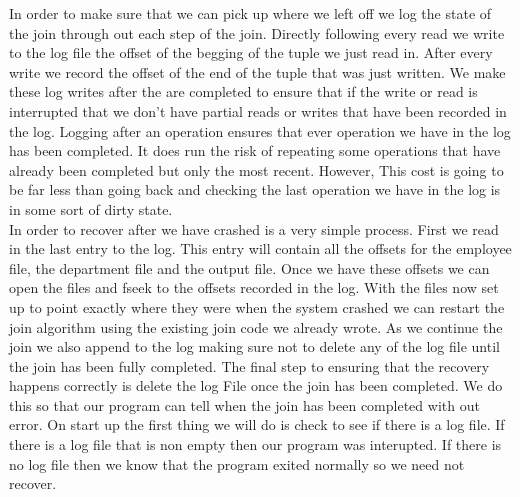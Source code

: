\documentclass[11pt]{article}
\begin{document}
In order to make sure that we can pick up where we left off we log the state of the join through out each step of the join. Directly following every read we write to the log file the offset of the begging of the tuple we just read in. After every write we record the offset of the end of the tuple that was just written. We make these log writes after the are completed to ensure that if the write or read is interrupted that we don't have partial reads or writes that have been recorded in the log. Logging after an operation ensures that ever operation we have in the log has been completed. It does run the risk of repeating some operations that have already been completed but only the most recent. However, This cost is going to be far less than going back and checking the last operation we have in the log is in some sort of dirty state.\\

In order to recover after we have crashed is a very simple process. First we read in the last entry to the log. This entry will contain all the offsets for the employee file, the department file and the output file. Once we have these offsets we can open the files and fseek to the offsets recorded in the log. With the files now set up to point exactly where they were when the system crashed we can restart the join algorithm using the existing join code we already wrote. As we continue the join we also append to the log making sure not to delete any of the log file until the join has been fully completed. The final step to ensuring that the recovery happens correctly is delete the log File once the join has been completed. We do this so that our program can tell when the join has been completed with out error. On start up the first thing we will do is check to see if there is a log file. If there is a log file that is non empty then our program was interupted. If there is no log file then we know that the program exited normally so we need not recover.\\
\end{document}
